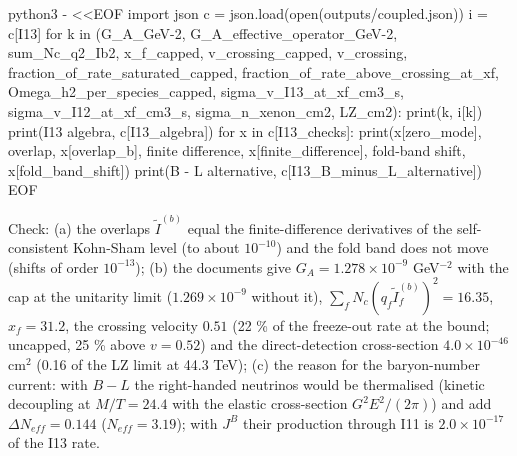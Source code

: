 \documentclass[
  10pt,
]{article}
\newenvironment{Shaded}{}{}
\newcommand{\NormalTok}[1]{#1}
\begin{document}
\begin{Shaded}
\begin{Highlighting}[]
\NormalTok{python3 {-} \textless{}\textless{}\textquotesingle{}EOF\textquotesingle{}}
\NormalTok{import json}
\NormalTok{c = json.load(open(\textquotesingle{}outputs/coupled.json\textquotesingle{}))}
\NormalTok{i = c[\textquotesingle{}I13\textquotesingle{}]}
\NormalTok{for k in (\textquotesingle{}G\_A\_GeV{-}2\textquotesingle{}, \textquotesingle{}G\_A\_effective\_operator\_GeV{-}2\textquotesingle{}, \textquotesingle{}sum\_Nc\_q2\_Ib2\textquotesingle{}, \textquotesingle{}x\_f\_capped\textquotesingle{}, \textquotesingle{}v\_crossing\_capped\textquotesingle{}, \textquotesingle{}v\_crossing\textquotesingle{},}
\NormalTok{          \textquotesingle{}fraction\_of\_rate\_saturated\_capped\textquotesingle{}, \textquotesingle{}fraction\_of\_rate\_above\_crossing\_at\_xf\textquotesingle{}, \textquotesingle{}Omega\_h2\_per\_species\_capped\textquotesingle{},}
\NormalTok{          \textquotesingle{}sigma\_v\_I13\_at\_xf\_cm3\_s\textquotesingle{}, \textquotesingle{}sigma\_v\_I12\_at\_xf\_cm3\_s\textquotesingle{}, \textquotesingle{}sigma\_n\_xenon\_cm2\textquotesingle{}, \textquotesingle{}LZ\_cm2\textquotesingle{}):}
\NormalTok{    print(k, i[k])}
\NormalTok{print(\textquotesingle{}I13 algebra\textquotesingle{}, c[\textquotesingle{}I13\_algebra\textquotesingle{}])}
\NormalTok{for x in c[\textquotesingle{}I13\_checks\textquotesingle{}]:}
\NormalTok{    print(x[\textquotesingle{}zero\_mode\textquotesingle{}], \textquotesingle{} overlap\textquotesingle{}, x[\textquotesingle{}overlap\_b\textquotesingle{}], \textquotesingle{} finite difference\textquotesingle{}, x[\textquotesingle{}finite\_difference\textquotesingle{}], \textquotesingle{} fold{-}band shift\textquotesingle{}, x[\textquotesingle{}fold\_band\_shift\textquotesingle{}])}
\NormalTok{print(\textquotesingle{}B {-} L alternative\textquotesingle{}, c[\textquotesingle{}I13\_B\_minus\_L\_alternative\textquotesingle{}])}
\NormalTok{EOF}
\end{Highlighting}
\end{Shaded}

Check: (a) the overlaps \(\tilde I^{(b)}\) equal the finite-difference
derivatives of the self-consistent Kohn-Sham level (to about
\(10^{-10}\)) and the fold band does not move (shifts of order
\(10^{-13}\)); (b) the documents give \(G_A = 1.278\times10^{-9}\)
GeV\(^{-2}\) with the cap at the unitarity limit (\(1.269\times10^{-9}\)
without it), \(\sum_fN_c(q_f\tilde I^{(b)}_f)^2 = 16.35\),
\(x_f = 31.2\), the crossing velocity \(0.51\) (22 \% of the freeze-out
rate at the bound; uncapped, 25 \% above \(v = 0.52\)) and the
direct-detection cross-section \(4.0\times10^{-46}\) cm\(^2\) (0.16 of
the LZ limit at 44.3 TeV); (c) the reason for the baryon-number current:
with \(B - L\) the right-handed neutrinos would be thermalised (kinetic
decoupling at \(M/T = 24.4\) with the elastic cross-section
\(G^2E^2/(2\pi)\)) and add \(\Delta N_{eff} = 0.144\)
(\(N_{eff} = 3.19\)); with \(J^B\) their production through I11 is
\(2.0\times10^{-17}\) of the I13 rate.
\end{document}
